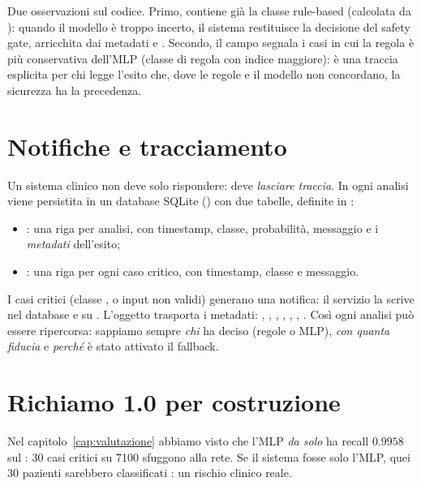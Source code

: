 Due osservazioni sul codice. Primo,  contiene già la classe
rule-based (calcolata da ): quando il modello è troppo
incerto, il sistema restituisce la decisione del safety gate, arricchita
dai metadati  e . Secondo,
il campo  segnala i casi in cui la regola è più
conservativa dell'MLP (classe di regola con indice maggiore): è una
traccia esplicita per chi legge l'esito che, dove le regole e il modello
non concordano, la sicurezza ha la precedenza.

\section{Notifiche e tracciamento}\label{sec:notifiche-tracciamento}

Un sistema clinico non deve solo rispondere: deve \emph{lasciare traccia}.
In \progetto{} ogni analisi viene persistita in un database SQLite
() con due tabelle, definite in
:

\begin{itemize}
  \item {}: una riga per analisi, con timestamp, classe,
        probabilità, messaggio e i \emph{metadati} dell'esito;
  \item {}: una riga per ogni caso critico, con timestamp,
        classe e messaggio.
\end{itemize}

I casi critici (classe , o input non validi) generano una
notifica: il servizio  la scrive nel
database e su . L'oggetto  trasporta i
metadati: , ,
, , ,
, . Così ogni analisi
può essere ripercorsa: sappiamo sempre \emph{chi} ha deciso (regole o
MLP), \emph{con quanta fiducia} e \emph{perché} è stato attivato il
fallback.

\section{Richiamo 1.0 per costruzione}\label{sec:richiamo-per-costruzione}

Nel capitolo~\ref{cap:valutazione} abbiamo visto che l'MLP \emph{da solo}
ha recall $0.9958$ sul : 30 casi critici su 7100 sfuggono alla
rete. Se il sistema fosse solo l'MLP, quei 30 pazienti sarebbero
classificati : un rischio clinico reale.

